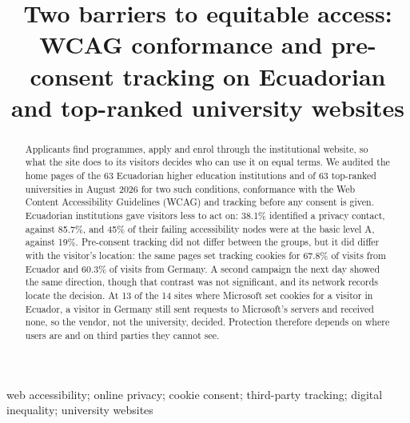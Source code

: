 \documentclass[]{interact}
\newif\ifanon
\begin{document}
\title{Two barriers to equitable access: {WCAG} conformance and pre-consent tracking on Ecuadorian and top-ranked university websites}

\ifanon
	\maketitle
\else
	\author{
	}
	\maketitle
\fi

\begin{abstract}
Applicants find programmes, apply and enrol through the institutional website, so what the site does to its visitors decides who can use it on equal terms. We audited the home pages of the 63 Ecuadorian higher education institutions and of 63 top-ranked universities in August 2026 for two such conditions, conformance with the Web Content Accessibility Guidelines (WCAG) and tracking before any consent is given. Ecuadorian institutions gave visitors less to act on: 38.1\% identified a privacy contact, against 85.7\%, and 45\% of their failing accessibility nodes were at the basic level A, against 19\%. Pre-consent tracking did not differ between the groups, but it did differ with the visitor's location: the same pages set tracking cookies for 67.8\% of visits from Ecuador and 60.3\% of visits from Germany. A second campaign the next day showed the same direction, though that contrast was not significant, and its network records locate the decision. At 13 of the 14 sites where Microsoft set cookies for a visitor in Ecuador, a visitor in Germany still sent requests to Microsoft's servers and received none, so the vendor, not the university, decided. Protection therefore depends on where users are and on third parties they cannot see.
\end{abstract}

\begin{keywords}
web accessibility; online privacy; cookie consent; third-party tracking; digital inequality; university websites
\end{keywords}
\end{document}
